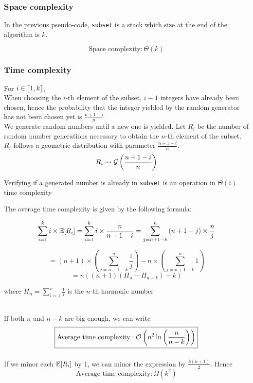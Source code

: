 \subsubsection{Space complexity}
	In the previous pseudo-code, \verb|subset| is a stack which size at the end of the algorithm is $k$.
	
	\[\boxed{\text{Space complexity}: \Theta(k)}\]
	

\subsubsection{Time complexity}
	For $i\in \llbracket1, k\rrbracket$, \\
	When choosing the $i$-th element of the subset, $i - 1$ integers have already been chosen, hence the probability that the integer yielded by the random generator has not been chosen yet is $\frac{n + 1 - i}{n}$\\
	
	We generate random numbers until a new one is yielded. Let $R_i$ be the number of random number generations necessary to obtain the $n$-th element of the subset. $R_i$ follows a geometric distribution with parameter $\frac{n + 1 - i}{n}$.
	\[R_i \leadsto \mathcal{G}\left(\frac{n + 1 - i}{n}\right)\]
	
	Verifying if a generated number is already in \verb|subset| is an operation in $\Theta(i)$ time complexity
	
	The average time complexity is given by the following formula:
	
	\[\sum_{i = 1}^{k}{i\times\mathbb{E}[R_i]} = \sum_{i = 1}^{k}{i\times\frac{n}{n + 1 - i}} = \sum_{j = n + 1 - k}^{n}{(n + 1 - j)\times\frac{n}{j}}\]
	
	\[= (n + 1)\times\left(\sum_{j = n + 1 - k}^{n}{\frac{1}{j}}\right) - n\times\left(\sum_{j = n + 1 - k}^{n}{1}\right)\]
	\[ = n\left((n + 1)\left(H_n - H_{n - k}\right) - k\right)\]
	
	where $H_n = \sum_{i = 1}^{n}{\frac{1}{i}}$ is the $n$-th harmonic number\\\
	
	
	If both $n$ and $n - k$ are big enough, we can write
	\[\boxed{\text{Average time complexity}: \mathcal{O}\left(n^2\ln\left(\frac{n}{n - k}\right)\right)}\]
	\[\]
	
	If we minor each $\mathbb{E}[R_i]$ by 1, we can minor the expression by $\frac{k(k+1)}{2}$. Hence
	\[\boxed{\text{Average time complexity}: \Omega\left(k^2\right)}\]
	\[\]
	
	
	